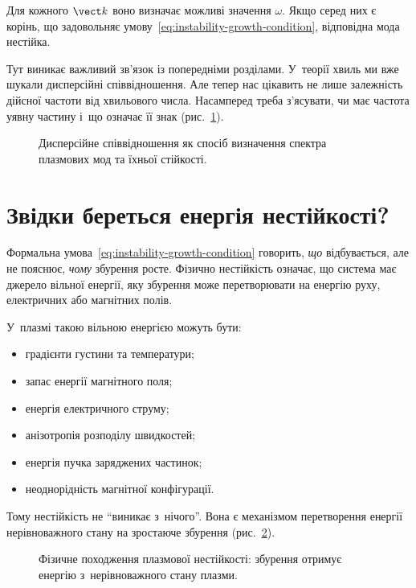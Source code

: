 Для кожного $\vect k$ воно визначає можливі значення $\omega$.
Якщо серед них є корінь, що задовольняє умову~\eqref{eq:instability-growth-condition}, відповідна мода нестійка.

Тут виникає важливий зв'язок із попередніми розділами. У~теорії хвиль
ми вже шукали дисперсійні співвідношення. Але тепер нас цікавить не
лише залежність дійсної частоти від хвильового числа. Насамперед треба
з'ясувати, чи має частота уявну частину і~що означає її знак (рис.~\ref{fig:instability-dispersion}).

\begin{figure}[ht]
\centering
{}
\caption{Дисперсійне співвідношення як спосіб визначення спектра
плазмових мод та їхньої стійкості.}
\label{fig:instability-dispersion}
\end{figure}

\section{Звідки береться енергія нестійкості?}

Формальна умова~\eqref{eq:instability-growth-condition} говорить,
\emph{що} відбувається, але не пояснює, \emph{чому} збурення росте.
Фізично нестійкість означає, що система має джерело вільної енергії,
яку збурення може перетворювати на енергію руху, електричних або
магнітних полів.

У~плазмі такою вільною енергією можуть бути:

\begin{itemize}
\item градієнти густини та температури;
\item запас енергії магнітного поля;
\item енергія електричного струму;
\item анізотропія розподілу швидкостей;
\item енергія пучка заряджених частинок;
\item неоднорідність магнітної конфігурації.
\end{itemize}

Тому нестійкість не \enquote{виникає з~нічого}. Вона є механізмом
перетворення енергії нерівноважного стану на зростаюче збурення (рис.~\ref{fig:instability-free-energy}).

\begin{figure}[ht]
\centering
{}
\caption{Фізичне походження плазмової нестійкості: збурення отримує
енергію з~нерівноважного стану плазми.}
\label{fig:instability-free-energy}
\end{figure}

